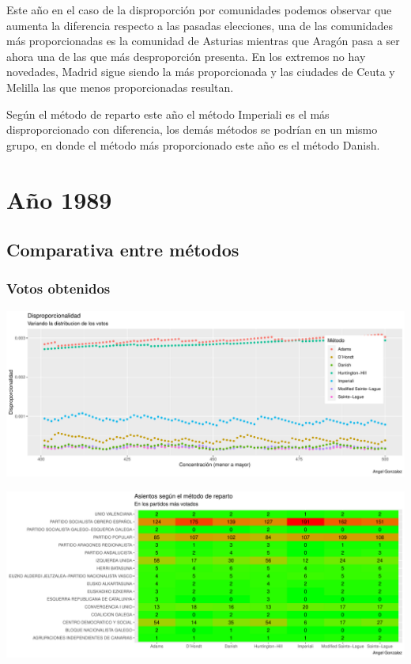 \documentclass[12pt,a4paper,]{book}
\numberwithin{dummy}{section}
\theoremstyle{ocrenumbox}
\theoremstyle{blacknumex}
\theoremstyle{blacknumbox}
\theoremstyle{ocrenum}
\theoremstyle{ocrenum}
\begin{document}
Este año en el caso de la disproporción por comunidades podemos observar
que aumenta la diferencia respecto a las pasadas elecciones, una de las
comunidades más proporcionadas es la comunidad de Asturias mientras que
Aragón pasa a ser ahora una de las que más desproporción presenta. En
los extremos no hay novedades, Madrid sigue siendo la más proporcionada
y las ciudades de Ceuta y Melilla las que menos proporcionadas resultan.

Según el método de reparto este año el método Imperiali es el más
disproporcionado con diferencia, los demás métodos se podrían en un
mismo grupo, en donde el método más proporcionado este año es el método
Danish.

\hypertarget{auxf1o-1989}{%
\section{Año 1989}\label{auxf1o-1989}}

\hypertarget{comparativa-entre-muxe9todos-4}{%
\subsection{Comparativa entre
métodos}\label{comparativa-entre-muxe9todos-4}}

\hypertarget{votos-obtenidos-4}{%
\subsubsection{Votos obtenidos}\label{votos-obtenidos-4}}

\begin{center}\includegraphics[width=0.95\linewidth]{figurasR/unnamed-chunk-47-1} \end{center}

\begin{center}\includegraphics[width=0.95\linewidth]{figurasR/unnamed-chunk-47-2} \end{center}
\end{document}
